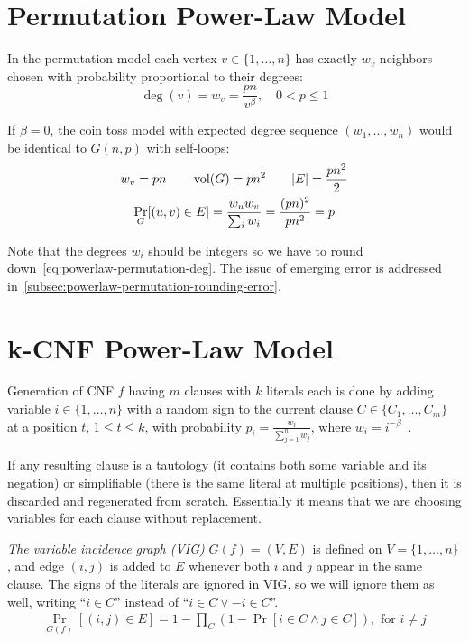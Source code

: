 \section{Permutation Power-Law Model}

In the permutation model each vertex $v\in\{1,\ldots,n\}$ has exactly
$w_v$ neighbors chosen with probability proportional to their degrees:
\begin{equation}
    \label{eq:powerlaw-permutation-deg}
    \deg(v)=w_v=\frac{pn}{v^\beta},\quad 0<p\leq 1
\end{equation}

If $\beta=0$, the coin toss model with expected degree sequence
$(w_1,\ldots,w_n)$ would be identical to $G(n,p)$ with self-loops:
\begin{gather*}
    w_v=pn
    \qquad \operatorname*{vol}(G)=pn^2
    \qquad|E|=\frac{p n^2}{2}\\
    \Pr_G[(u,v)\in E]=\frac{w_u w_v}{\sum_i w_i}=\frac{(pn)^2}{pn^2}=p
\end{gather*}

Note that the degrees $w_i$ should be integers so we have
to round down~\eqref{eq:powerlaw-permutation-deg}. The issue of emerging error
is addressed in~\autoref{subsec:powerlaw-permutation-rounding-error}.

\section{k-CNF Power-Law Model}
\label{sec:powerlaw-k-cnf-model}

Generation of CNF $f$ having $m$ clauses with $k$ literals each is done by adding variable $i\in\{1,\ldots,n\}$
with a random sign to the current clause $C\in\{C_1,\ldots,C_m\}$ at a position $t$, $1\leq t\leq k$, with probability
$p_i=\frac{w_i}{\sum_{j=1}^{n}{w_j}}$, where $w_i=i^{-\beta}$~\cite{abl09}.

If any resulting clause is a tautology (it contains both some variable and its negation) or simplifiable (there is the same literal at multiple positions),
then it is discarded and regenerated from scratch. Essentially it means that we are choosing variables for each clause without replacement.

\textit{The variable incidence graph (VIG)} $G(f)=(V,E)$ is defined on $V=\{1,\ldots,n\}$,
and edge $(i,j)$ is added to $E$ whenever both $i$ and $j$ appear in the same clause.
The signs of the literals are ignored in VIG, so we will ignore them as well,
writing ``$i\in C$'' instead of ``$i\in C\lor-i\in C$''.
\begin{gather}
    \Pr_{G(f)}[(i,j)\in E]=1-\prod_C{(1-\Pr[i\in C\land j\in C])},\text{ for }i\neq j
\end{gather}

